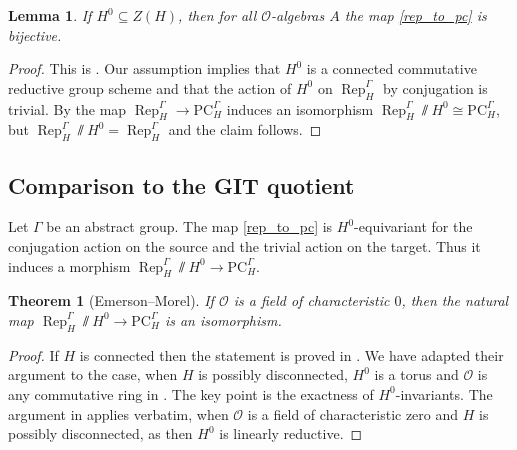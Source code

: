 \documentclass{amsart}
\newtheorem{lem}[prop]{Lemma}
\newtheorem{thm}[prop]{Theorem}
\theoremstyle{definition}
\theoremstyle{remark}
\DeclareMathOperator{\Rep}{Rep}
\newcommand{\OO}{\mathcal O}
\newcommand{\PC}{\mathrm{PC}}
\begin{document}
\begin{lem}\label{lit_defT}
    If $H^0 \subseteq Z(H)$, then for all $\OO$-algebras $A$ the map \eqref{rep_to_pc} is bijective.
\end{lem}

\begin{proof}
    This is \cite[Lemma 6.3 (1)]{defT}.
    Our assumption implies that $H^0$ is a connected commutative reductive group scheme and that the action of $H^0$ on $\Rep^{\Gamma}_H$ by conjugation is trivial. By \cite[Proposition 6.2]{defT} the map $\Rep^{\Gamma}_H \to \PC^{\Gamma}_H$ induces an isomorphism $\Rep^{\Gamma}_H \sslash H^0 \cong \PC^{\Gamma}_H$, but $\Rep^{\Gamma}_H \sslash H^0 = \Rep^{\Gamma}_H$ and the claim follows.
\end{proof}

\subsection{Comparison to the GIT quotient} 
Let $\Gamma$ be an abstract group. The map \eqref{rep_to_pc} is $H^0$-equivariant for the conjugation action on the source and the 
trivial action on the target. Thus it induces a morphism $\Rep^{\Gamma}_H \sslash H^0\rightarrow \PC^{\Gamma}_H$. 


\begin{thm}[Emerson--Morel]\label{EM_dis}
    If $\OO$ is a field of characteristic $0$, then the natural map $\Rep^{\Gamma}_H \sslash H^0 \to \PC^{\Gamma}_H$ is an isomorphism.
\end{thm}

\begin{proof}
If $H$ is connected then the statement is proved in \cite[Proposition 2.11 (i)]{emerson2023comparison}.  We have adapted their argument to the 
case, when $H$ is possibly disconnected, $H^0$ is a torus and $\OO$ is any commutative ring in \cite[Proposition 6.2]{defT}. The key point is the exactness of  $H^0$-invariants. The argument in \cite[Proposition 6.2]{defT} applies verbatim, when $\OO$ is a field of characteristic zero and $H$ is possibly  disconnected, as then $H^0$ is linearly reductive. 
\end{proof}
\end{document}
